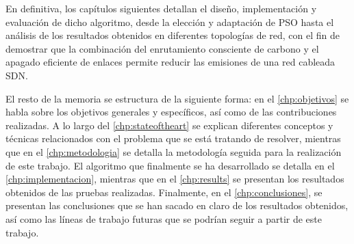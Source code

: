
En definitiva, los capítulos siguientes detallan el diseño, implementación y evaluación de dicho algoritmo, desde la elección y adaptación de PSO hasta el análisis de los resultados obtenidos en diferentes topologías de red, con el fin de demostrar que la combinación del enrutamiento consciente de carbono y el apagado eficiente de enlaces permite reducir las emisiones de una red cableada SDN.

El resto de la memoria se estructura de la siguiente forma: en el \autoref{chp:objetivos} se habla sobre los objetivos generales y específicos, así como de las contribuciones realizadas. A lo largo del \autoref{chp:stateoftheart} se explican diferentes conceptos y técnicas relacionados con el problema que se está tratando de resolver, mientras que en el \autoref{chp:metodologia} se detalla la metodología seguida para la realización de este trabajo. El algoritmo que finalmente se ha desarrollado se detalla en el \autoref{chp:implementacion}, mientras que en el \autoref{chp:results} se presentan los resultados obtenidos de las pruebas realizadas. Finalmente, en el \autoref{chp:conclusiones}, se presentan las conclusiones que se han sacado en claro de los resultados obtenidos, así como las líneas de trabajo futuras que se podrían seguir a partir de este trabajo.